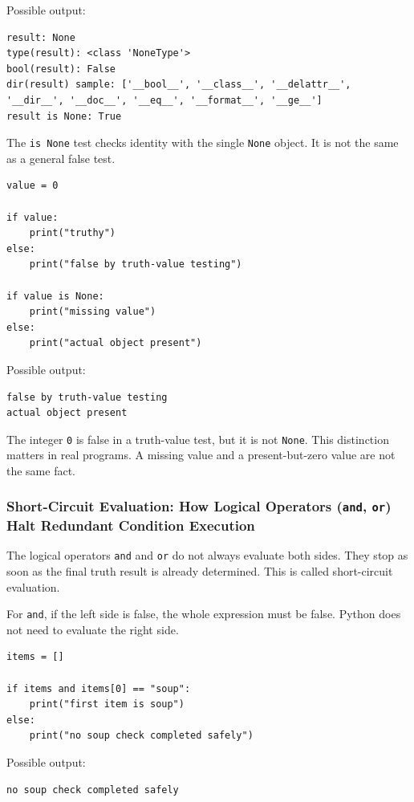 Possible output:

\begin{verbatim}
result: None
type(result): <class 'NoneType'>
bool(result): False
dir(result) sample: ['__bool__', '__class__', '__delattr__', '__dir__', '__doc__', '__eq__', '__format__', '__ge__']
result is None: True
\end{verbatim}

The \texttt{is None} test checks identity with the single \texttt{None} object. It is not the same as a general false test.

\begin{verbatim}
value = 0

if value:
    print("truthy")
else:
    print("false by truth-value testing")

if value is None:
    print("missing value")
else:
    print("actual object present")
\end{verbatim}

Possible output:

\begin{verbatim}
false by truth-value testing
actual object present
\end{verbatim}

The integer \texttt{0} is false in a truth-value test, but it is not \texttt{None}. This distinction matters in real programs. A missing value and a present-but-zero value are not the same fact.

\subsubsection{Short-Circuit Evaluation: How Logical Operators (\texttt{and}, \texttt{or}) Halt Redundant Condition Execution}

The logical operators \texttt{and} and \texttt{or} do not always evaluate both sides. They stop as soon as the final truth result is already determined. This is called short-circuit evaluation.

For \texttt{and}, if the left side is false, the whole expression must be false. Python does not need to evaluate the right side.

\begin{verbatim}
items = []

if items and items[0] == "soup":
    print("first item is soup")
else:
    print("no soup check completed safely")
\end{verbatim}

Possible output:

\begin{verbatim}
no soup check completed safely
\end{verbatim}

